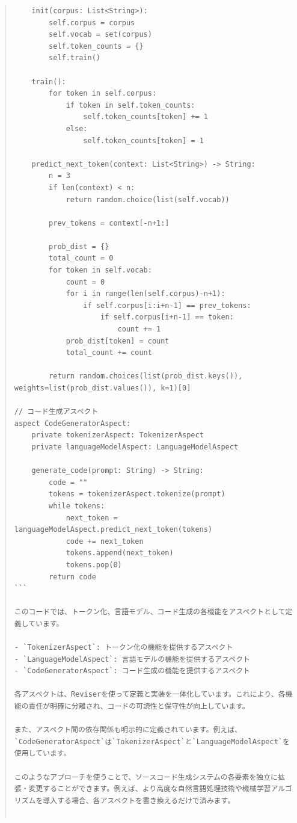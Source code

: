 \documentclass{jsarticle}
\begin{document}
\begin{quote}
\begin{verbatim}
    init(corpus: List<String>):
        self.corpus = corpus
        self.vocab = set(corpus)
        self.token_counts = {}
        self.train()

    train():
        for token in self.corpus:
            if token in self.token_counts:
                self.token_counts[token] += 1
            else:
                self.token_counts[token] = 1

    predict_next_token(context: List<String>) -> String:
        n = 3
        if len(context) < n:
            return random.choice(list(self.vocab))
        
        prev_tokens = context[-n+1:]
        
        prob_dist = {}
        total_count = 0
        for token in self.vocab:
            count = 0
            for i in range(len(self.corpus)-n+1):
                if self.corpus[i:i+n-1] == prev_tokens:
                    if self.corpus[i+n-1] == token:
                        count += 1
            prob_dist[token] = count
            total_count += count
        
        return random.choices(list(prob_dist.keys()), weights=list(prob_dist.values()), k=1)[0]

// コード生成アスペクト
aspect CodeGeneratorAspect:
    private tokenizerAspect: TokenizerAspect
    private languageModelAspect: LanguageModelAspect

    generate_code(prompt: String) -> String:
        code = ""
        tokens = tokenizerAspect.tokenize(prompt)
        while tokens:
            next_token = languageModelAspect.predict_next_token(tokens)
            code += next_token
            tokens.append(next_token)
            tokens.pop(0)
        return code
```

このコードでは、トークン化、言語モデル、コード生成の各機能をアスペクトとして定義しています。

- `TokenizerAspect`: トークン化の機能を提供するアスペクト
- `LanguageModelAspect`: 言語モデルの機能を提供するアスペクト
- `CodeGeneratorAspect`: コード生成の機能を提供するアスペクト

各アスペクトは、Reviserを使って定義と実装を一体化しています。これにより、各機能の責任が明確に分離され、コードの可読性と保守性が向上しています。

また、アスペクト間の依存関係も明示的に定義されています。例えば、`CodeGeneratorAspect`は`TokenizerAspect`と`LanguageModelAspect`を使用しています。

このようなアプローチを使うことで、ソースコード生成システムの各要素を独立に拡張・変更することができます。例えば、より高度な自然言語処理技術や機械学習アルゴリズムを導入する場合、各アスペクトを書き換えるだけで済みます。


\end{verbatim}
\end{quote}
\end{document}
